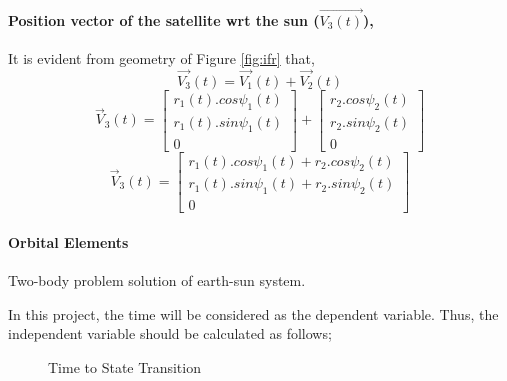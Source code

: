 \documentclass[11pt]{article}
\begin{document}
\paragraph{Position vector of the satellite wrt the sun ($\vec{V_3(t)}$),}

It is evident from geometry of Figure \ref{fig:ifr} that,
\begin{equation}
    \vec{V_3}(t) = \vec{V_1}(t) + \vec{V_2}(t)
\end{equation}
\begin{equation}
    \vec{V}_3(t)  = 
            \begin{bmatrix}
            r_1(t) . cos{\psi_1(t)}  \\
            r_1(t) . sin{\psi_1(t)} \\
             0             
            \end{bmatrix} 
            +
            \begin{bmatrix}
            r_2 . cos{\psi_2(t)}  \\
            r_2 . sin{\psi_2(t)} \\
             0             
            \end{bmatrix}  
\end{equation}
\begin{equation}
    \vec{V}_3(t)  =  
            \begin{bmatrix}
            r_1(t) . cos{\psi_1(t)} +r_2 . cos{\psi_2(t)}  \\
            r_1(t) . sin{\psi_1(t)} +r_2 . sin{\psi_2(t)} \\
             0                                
            \end{bmatrix} 
\end{equation}


\paragraph{Orbital Elements}


Two-body problem solution of earth-sun system\cite{fortescue2011spacecraft}.  
 

In this project, the time will be considered as the dependent variable. Thus, the independent variable should be calculated as follows;

\begin{figure}[h]
\centering
{}
\caption{Time to State Transition}
\label{fig:2}
\end{figure}
\end{document}
